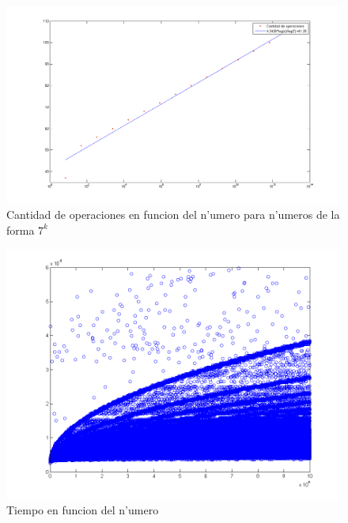 \begin{figure}[H]
\centering
\includegraphics[scale=0.5]{../../codigo/ejercicio1/benchmark/graficos/potencias_de_7/graficoPotenciasDe7.png}
\caption{Cantidad de operaciones en funcion del n'umero para n'umeros de la forma $7^k$}
\end{figure}

\begin{figure}[H]
\centering
\includegraphics[scale=0.5]{../../codigo/ejercicio1/benchmark_de_tiempo/graficos/todos_los_numeros/todosLosNumerosPuntosTiempo.png}
\caption{Tiempo en funcion del n'umero}
\end{figure}

